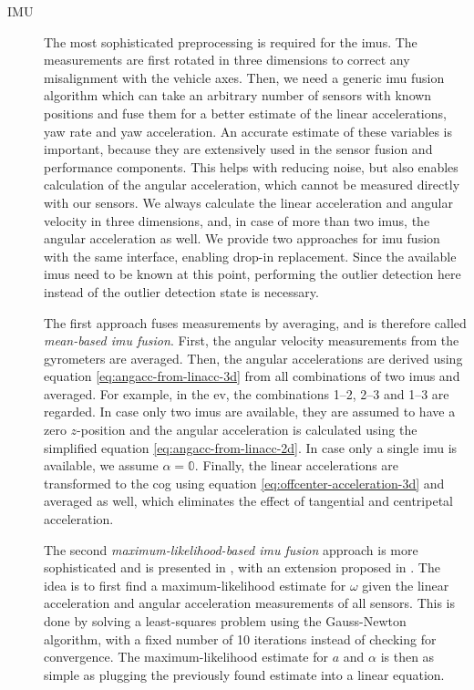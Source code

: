 \begin{description}
\item[IMU] The most sophisticated preprocessing is required for the \glspl{imu}. The measurements are first rotated in three dimensions to correct any misalignment with the vehicle axes. Then, we need a generic \gls{imu} fusion algorithm which can take an arbitrary number of sensors with known positions and fuse them for a better estimate of the linear accelerations, yaw rate and yaw acceleration. An accurate estimate of these variables is important, because they are extensively used in the sensor fusion and performance components. This helps with reducing noise, but also enables calculation of the angular acceleration, which cannot be measured directly with our sensors. We always calculate the linear acceleration and angular velocity in three dimensions, and, in case of more than two \glspl{imu}, the angular acceleration as well. We provide two approaches for \gls{imu} fusion with the same interface, enabling drop-in replacement. Since the available \glspl{imu} need to be known at this point, performing the outlier detection here instead of the outlier detection state is necessary.

The first approach fuses measurements by averaging, and is therefore called \textit{mean-based \gls{imu} fusion}. First, the angular velocity measurements from the gyrometers are averaged. Then, the angular accelerations are derived using equation \ref{eq:angacc-from-linacc-3d} from all combinations of two \glspl{imu} and averaged. For example, in the \gls{ev}, the combinations 1--2, 2--3 and 1--3 are regarded. In case only two \glspl{imu} are available, they are assumed to have a zero $z$-position and the angular acceleration is calculated using the simplified equation \ref{eq:angacc-from-linacc-2d}. In case only a single \gls{imu} is available, we assume $\alpha = \mathbb{0}$. Finally, the linear accelerations are transformed to the \gls{cog} using equation \ref{eq:offcenter-acceleration-3d} and averaged as well, which eliminates the effect of tangential and centripetal acceleration.

The second \textit{maximum-likelihood-based \gls{imu} fusion} approach is more sophisticated and is presented in \cite{Skog.2016}, with an extension proposed in \cite{Wahlstrom.2018}. The idea is to first find a maximum-likelihood estimate for $\omega$ given the linear acceleration and angular acceleration measurements of all sensors. This is done by solving a least-squares problem using the Gauss-Newton algorithm, with a fixed number of 10 iterations instead of checking for convergence. The maximum-likelihood estimate for $a$ and $\alpha$ is then as simple as plugging the previously found estimate into a linear equation.
\end{description}

